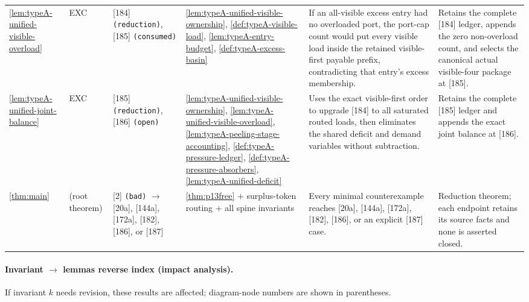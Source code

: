 \documentclass[11pt]{article}
\begin{document}
{\begin{longtable}{L{0.10\textwidth} C{0.045\textwidth} L{0.13\textwidth} L{0.135\textwidth} L{0.28\textwidth} L{0.20\textwidth}}
\cref{lem:typeA-unified-visible-overload} & EXC & [184] \texttt{(reduction)}, [185] \texttt{(consumed)} & \cref{lem:typeA-unified-visible-ownership}, \cref{def:typeA-visible-load}, \cref{lem:typeA-entry-budget}, \cref{def:typeA-excess-basin} & If an all-visible excess entry had no overloaded port, the port-cap count would put every visible load inside the retained visible-first payable prefix, contradicting that entry's excess membership. & Retains the complete [184] ledger, appends the zero non-overload count, and selects the canonical actual visible-four package at [185]. \\
\cref{lem:typeA-unified-joint-balance} & EXC & [185] \texttt{(reduction)}, [186] \texttt{(open)} & \cref{lem:typeA-unified-visible-ownership}, \cref{lem:typeA-unified-visible-overload}, \cref{lem:typeA-peeling-stage-accounting}, \cref{def:typeA-pressure-ledger}, \cref{def:typeA-pressure-absorbers}, \cref{lem:typeA-unified-deficit} & Uses the exact visible-first order to upgrade [184] to all saturated routed loads, then eliminates the shared deficit and demand variables without subtraction. & Retains the complete [185] ledger and appends the exact joint balance at [186]. \\
\cref{thm:main} & (root theorem) & [2] \texttt{(bad)} $\to$ [20a], [144a], [172a], [182], [186], or [187] & \cref{thm:p13free} $+$ surplus-token routing $+$ all spine invariants & Every minimal counterexample reaches [20a], [144a], [172a], [182], [186], or an explicit [187] case. & Reduction theorem; each endpoint retains its source facts and none is asserted closed. \\
\bottomrule
\end{longtable}
}

\paragraph{Invariant $\to$ lemmas reverse index (impact analysis).}
If invariant $k$ needs revision, these results are affected; diagram-node numbers are shown in parentheses.
\end{document}
